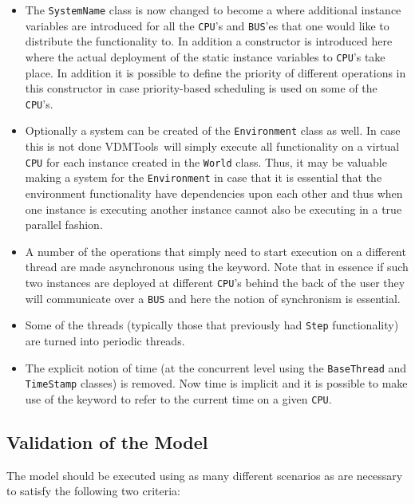\documentclass{overturerepchap}
\newcommand{\vdmtools}{VDMTools}
\begin{document}
\begin{itemize}
\item The \texttt{SystemName} class is now changed to become a
  {\bf{}} 
      where additional instance variables are introduced for all the
      \texttt{CPU}'s and \texttt{BUS}'es that one would like to distribute
      the functionality to. In addition a constructor is introduced here
      where the actual deployment of the static instance variables to
      \texttt{CPU}'s take place. In addition it is possible to define the
      priority of different operations in this constructor in case 
      priority-based scheduling is used on some of the \texttt{CPU}'s. 
\item Optionally a system can be created of the \texttt{Environment} class
      as well. In case this is not done \vdmtools\ will simply execute
      all functionality on a virtual \texttt{CPU} for each instance created in the
      \texttt{World} class. Thus, it may be valuable making a system for
      the \texttt{Environment} in case that it is essential that the 
      environment functionality have dependencies upon each other and thus
      when one instance is executing another instance cannot also be 
      executing in a true parallel fashion.  
\item A number of the operations that simply need to start execution on
      a different thread are made asynchronous using the {\bf{}}
      keyword. Note that in essence if such two instances are deployed at 
      different \texttt{CPU}'s behind the back of the user they will
      communicate over a \texttt{BUS} and here the notion of synchronism
      is essential.
\item Some of the threads (typically those that previously had \texttt{Step}
      functionality) are turned into periodic threads.
\item The explicit notion of time (at the concurrent level using the 
      \texttt{BaseThread} and \texttt{TimeStamp} classes) is removed. 
      Now time is implicit and it
      is possible to make use of the keyword {\bf{}} to refer to the
      current time on a given \texttt{CPU}.
\end{itemize}

\subsection{Validation of the Model}

The model should be executed using as many different scenarios as are
necessary to satisfy the following two criteria:
\end{document}
